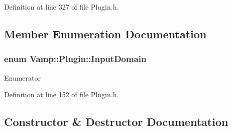Definition at line 327 of file Plugin.\+h.



\subsection{Member Enumeration Documentation}
\subsubsection[{\texorpdfstring{Input\+Domain}{InputDomain}}]{\setlength{\rightskip}{0pt plus 5cm}enum {\bf Vamp\+::\+Plugin\+::\+Input\+Domain}}\hypertarget{class_vamp_1_1_plugin_a39cb7649d6dcc20e4cb1640cd55907bc}{}\label{class_vamp_1_1_plugin_a39cb7649d6dcc20e4cb1640cd55907bc}
\begin{Desc}
\item[Enumerator]\par
\begin{description}
\item[{\em 
Time\+Domain\hypertarget{class_vamp_1_1_plugin_a39cb7649d6dcc20e4cb1640cd55907bcad4a9f31b958a43a9757af7893aa2e7ff}{}\label{class_vamp_1_1_plugin_a39cb7649d6dcc20e4cb1640cd55907bcad4a9f31b958a43a9757af7893aa2e7ff}
}]\item[{\em 
Frequency\+Domain\hypertarget{class_vamp_1_1_plugin_a39cb7649d6dcc20e4cb1640cd55907bcaa30e7877ab33f76acbdca28607e6ab53}{}\label{class_vamp_1_1_plugin_a39cb7649d6dcc20e4cb1640cd55907bcaa30e7877ab33f76acbdca28607e6ab53}
}]\end{description}
\end{Desc}


Definition at line 152 of file Plugin.\+h.



\subsection{Constructor \& Destructor Documentation}
